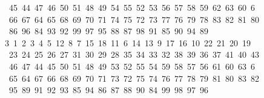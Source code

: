 \begin{tabbing}
\ 45\ 44\ 47\ 46\ 50\ 51\ 48\ 49\ 54\ 55\ 52\ 53\ 56\ 57\ 58\ 59\ 62\ 63\ 60\ 6\\[0pt]
\ 66\ 67\ 64\ 65\ 68\ 69\ 70\ 71\ 74\ 75\ 72\ 73\ 77\ 76\ 79\ 78\ 83\ 82\ 81\ 80\\[0pt]
\>\ 86\ 96\ 84\ 93\ 92\ 99\ 97\ 95\ 88\ 87\ 98\ 91\ 85\ 90\ 94\ 89\\[0pt]
3\ 1\ 2\ 3\ 4\ 5\ 12\ 8\ 7\ 15\ 18\ 11\ 6\ 14\ 13\ 9\ 17\ 16\ 10\ 22\ 21\ 20\ 19\\[0pt]
\>\ 23\ 24\ 25\ 26\ 27\ 31\ 30\ 29\ 28\ 35\ 34\ 33\ 32\ 38\ 39\ 36\ 37\ 41\ 40\ 43\ \\[0pt]
\ 46\ 47\ 44\ 45\ 50\ 51\ 48\ 49\ 53\ 52\ 55\ 54\ 59\ 58\ 57\ 56\ 61\ 60\ 63\ 6\\[0pt]
\ 65\ 64\ 67\ 66\ 68\ 69\ 70\ 71\ 73\ 72\ 75\ 74\ 76\ 77\ 78\ 79\ 81\ 80\ 83\ 82\\[0pt]
\>\ 95\ 89\ 91\ 92\ 93\ 85\ 94\ 86\ 87\ 88\ 90\ 84\ 99\ 98\ 97\ 96\\[0pt]

\end{tabbing}
